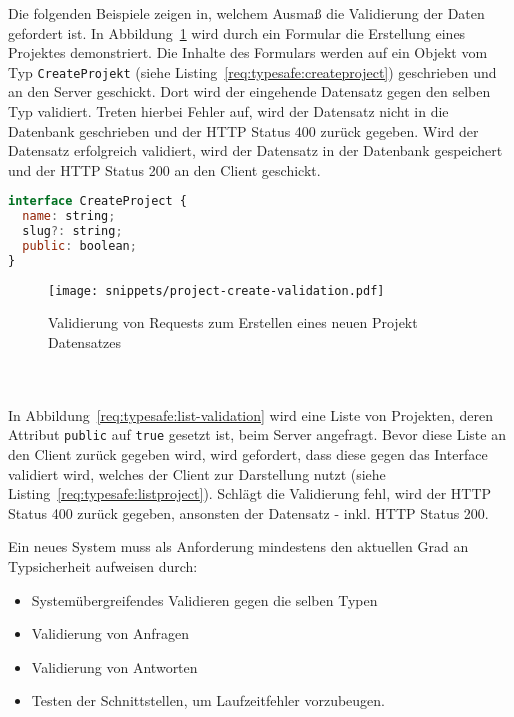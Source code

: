 Die folgenden Beispiele zeigen in, welchem Ausmaß die Validierung der Daten gefordert ist. In Abbildung~\ref{req:typesafe:request-validation} wird durch ein Formular die Erstellung eines Projektes demonstriert. Die Inhalte des Formulars werden auf ein Objekt vom Typ \texttt{CreateProjekt} (siehe Listing~\ref{req:typesafe:createproject}) geschrieben und an den Server geschickt. Dort wird der eingehende Datensatz gegen den selben Typ validiert. Treten hierbei Fehler auf, wird der Datensatz nicht in die Datenbank geschrieben und der HTTP Status 400 zurück gegeben.
Wird der Datensatz erfolgreich validiert, wird der Datensatz in der Datenbank gespeichert und der HTTP Status 200 an den Client geschickt.

\begin{lstlisting}[language=Javascript,float=h!,caption={Interface zum Erstellen eines Projektes}, label={req:typesafe:createproject}]
interface CreateProject {
  name: string;
  slug?: string;
  public: boolean;
}
\end{lstlisting}

\begin{figure}[h!]
	\centering
	\texttt{[image: snippets/project-create-validation.pdf]}
	\caption{Validierung von Requests zum Erstellen eines neuen Projekt Datensatzes}
	\label{req:typesafe:request-validation}
\end{figure}

\ \\
\ \\

In Abbildung~\ref{req:typesafe:list-validation} wird eine Liste von Projekten, deren Attribut \texttt{public} auf \texttt{true} gesetzt ist, beim Server angefragt. Bevor diese Liste an den Client zurück gegeben wird, wird gefordert, dass diese gegen das Interface validiert wird, welches der Client zur Darstellung nutzt (siehe Listing~\ref{req:typesafe:listproject}). Schlägt die Validierung fehl, wird der HTTP Status 400 zurück gegeben, ansonsten der Datensatz - inkl. HTTP Status 200.



Ein neues System muss als Anforderung mindestens den aktuellen Grad an Typsicherheit aufweisen durch:

\begin{itemize}
    \setlength\itemsep{-1em}
    \item Systemübergreifendes Validieren gegen die selben Typen
    \item Validierung von Anfragen
    \item Validierung von Antworten
    \item Testen der Schnittstellen, um Laufzeitfehler vorzubeugen.
\end{itemize}

